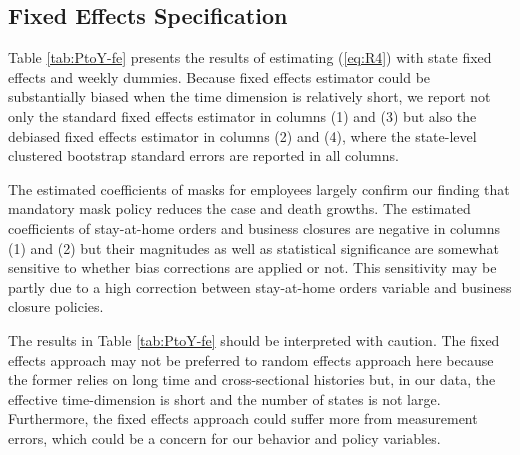 \documentclass[11pt,reqno,letter]{amsart}
\theoremstyle{definition}
\begin{document}
\subsection{Fixed Effects Specification}

Table \ref{tab:PtoY-fe} presents the results of estimating (\ref{eq:R4})  with  state fixed effects and weekly dummies.  Because fixed effects estimator could be substantially biased when the time dimension is relatively short, we report not only the standard fixed effects estimator in columns (1) and (3) but also the debiased fixed effects estimator \citep[e.g.,][]{chen2019mastering} in columns (2) and (4), where the state-level clustered bootstrap standard errors are reported in all columns.

The estimated coefficients of masks for employees largely confirm our finding that mandatory mask policy reduces the case and death growths. The estimated coefficients of stay-at-home orders and business closures are negative in columns (1) and (2) but their magnitudes as well as statistical significance are somewhat sensitive to whether bias corrections are applied or not. This sensitivity may be partly due to a high correction between stay-at-home orders variable and business closure policies.

The results in Table \ref{tab:PtoY-fe} should be interpreted with caution. The fixed effects approach may not be preferred to random effects approach here because the former relies on long time and cross-sectional histories but, in our data, the effective time-dimension is short and the number of states is not large. Furthermore, the fixed effects approach could suffer more from  measurement errors, which could be a concern for our behavior and policy variables.
\end{document}
